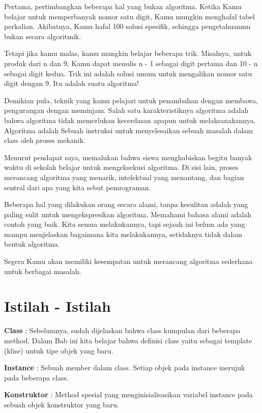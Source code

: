 Pertama, pertimbangkan beberapa hal yang bukan algoritma. Ketika Kamu belajar untuk memperbanyak nomor satu digit, Kamu mungkin menghafal tabel perkalian. Akibatnya, Kamu hafal 100 solusi spesifik, sehingga pengetahuanmu bukan secara algoritmik.

Tetapi jika kamu malas, kamu mungkin belajar beberapa trik. Misalnya, untuk produk dari n dan 9, Kamu dapat menulis n - 1 sebagai digit pertama dan 10 - n sebagai digit kedua. Trik ini adalah solusi umum untuk mengalikan nomor satu digit dengan 9. Itu adalah suatu algoritma!

Demikian pula, teknik yang kamu pelajari untuk penambahan dengan membawa, pengurangan dengan meminjam. Salah satu karakteristiknya algoritma adalah bahwa algoritma tidak memerlukan kecerdasan apapun untuk melaksanakannya. Algoritma adalah  Sebuah instruksi untuk menyelesaikan sebuah masalah dalam class oleh proses mekanik.

Menurut pendapat saya, memalukan bahwa siswa menghabiskan begitu banyak waktu di sekolah belajar untuk mengeksekusi algoritma. Di sisi lain, proses merancang algoritma yang menarik, intelektual yang menantang, dan bagian sentral dari apa yang kita sebut pemrograman.

Beberapa hal yang dilakukan orang secara alami, tanpa kesulitan adalah yang paling sulit untuk mengekspresikan algoritma. Memahami bahasa alami adalah contoh yang baik. Kita semua melakukannya, tapi sejauh ini belum ada yang mampu menjelaskan bagaimana kita melakukannya, setidaknya tidak dalam bentuk algoritma.

Segera Kamu akan memiliki kesempatan untuk merancang algoritma sederhana untuk berbagai masalah. 

\section{Istilah - Istilah}

\textbullet \textbf{Class} : Sebelumnya, sudah dijelaskan bahwa class kumpulan dari beberapa method. Dalam Bab ini kita belajar bahwa definisi class yaitu sebagai template (klise) untuk tipe objek yang baru. \newline

\textbullet \textbf{Instance} : Sebuah member dalam class. Setiap objek pada instance merujuk pada beberapa class. \newline

\textbullet \textbf{Konstruktor} : Method spesial yang menginisialisasikan variabel instance pada sebuah objek konstruktor yang baru. \newline


